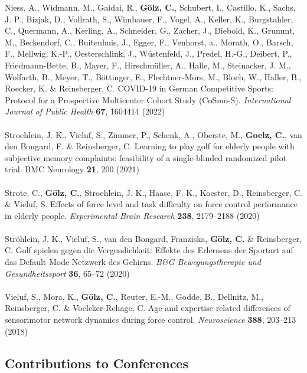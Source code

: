 Niess, A., Widmann, M., Gaidai, R., \textbf{Gölz, C.}, Schubert, I., Castillo, K., Sachs, J. P., Bizjak, D., Vollrath, S., Wimbauer, F., Vogel, A., Keller, K., Burgstahler, C., Quermann, A., Kerling, A., Schneider, G., Zacher, J., Diebold, K., Grummt, M., Beckendorf, C., Buitenhuis, J., Egger, F., Venhorst, a., Morath, O., Barsch, F., Mellwig, K.-P., Oesterschlink, J., Wüstenfeld, J., Predel, H.-G., Deibert, P., Friedmann-Bette, B., Mayer, F., Hirschmüller, A., Halle, M., Steinacker, J. M., Wolfarth, B., Meyer, T., Böttinger, E., Flechtner-Mors, M., Bloch, W., Haller, B., Roecker, K. \& Reinsberger, C. COVID-19 in German Competitive Sports: Protocol for a Prospective Multicenter Cohort Study (CoSmo-S). \textit{International Journal of Public Health} \textbf{67}, 1604414 (2022)\\
\\
Stroehlein, J. K., Vieluf, S., Zimmer, P., Schenk, A., Oberste, M., \textbf{Goelz, C.}, van den Bongard, F. \& Reinsberger, C. Learning to play golf for elderly people with subjective memory complaints: feasibility of a single-blinded randomized pilot trial. BMC Neurology \textbf{21}, 200 (2021)\\
\\
Strote, C., \textbf{Gölz, C.}, Stroehlein, J. K., Haase, F. K., Koester, D., Reinsberger, C. \& Vieluf, S. Effects of force level and task difficulty on force control performance in elderly people. \textit{Experimental Brain Research} \textbf{238}, 2179--2188 (2020)\\
\\
Ströhlein, J. K., Vieluf, S., van den Bongard, Franziska, \textbf{Gölz, C.} \& Reinsberger, C. Golf spielen gegen die Vergesslichkeit: Effekte des Erlernens der Sportart auf das Default Mode Netzwerk des Gehirns. \textit{B\&G Bewegungstherapie und Gesundheitssport} \textbf{36}, 65--72 (2020)\\
\\
Vieluf, S., Mora, K., \textbf{Gölz, C.}, Reuter, E.-M., Godde, B., Dellnitz, M., Reinsberger, C. \& Voelcker-Rehage, C. Age-and expertise-related differences of sensorimotor network dynamics during force control. \textit{Neuroscience} \textbf{388}, 203--213 (2018)\\

\subsection*{Contributions to Conferences}
